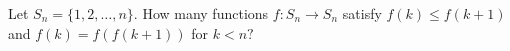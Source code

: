 Let \(S_{n}=\{1,2,\dots,n\}\). How many functions \(f\colon S_{n} \to S_{n}\) satisfy \(f(k) \leq f(k+1)\) and \(f(k)=f(f(k+1))\) for \(k <n?\)